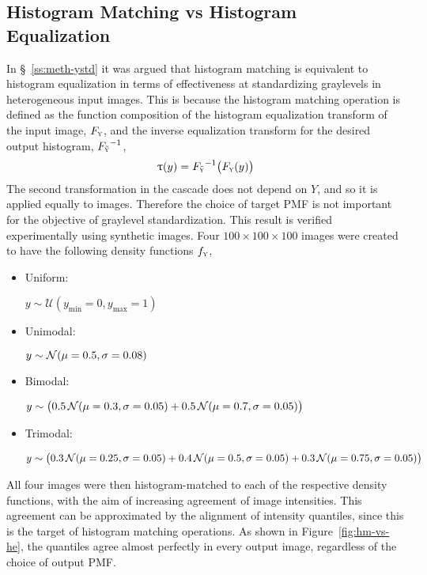 \subsection{Histogram Matching vs Histogram Equalization}\label{ss:hm-vs-he}
In \S~\ref{ss:meth-ystd} it was argued that
histogram matching is equivalent to histogram equalization
in terms of effectiveness at standardizing graylevels in heterogeneous input images.
This is because the histogram matching operation is defined as
the function composition of the histogram equalization transform of the input image, $F_{\textsc{y}}$,
and the inverse equalization transform for the desired output histogram, ${F_{\tilde{\textsc{y}}}}^{-1}$,
\begin{equation}
  \uptau(y) = {F_{\tilde{\textsc{y}}}}^{-1}\big(F_{\textsc{y}}(y)\big)
\end{equation}
The second transformation in the cascade does not depend on $Y$,
and so it is applied equally to images.
Therefore the choice of target PMF is not important for the objective of graylevel standardization.
This result is verified experimentally using synthetic images.
Four $100\times100\times100$ images were created to have the following density functions $f_{\textsc{y}}$,
\begin{itemize}[itemsep=0pt,topsep=0pt]
  \item \parbox{2cm}{Uniform:}
  $y\sim\mathcal{U}(y_{\min}=0,y_{\max}=1)$
  \item \parbox{2cm}{Unimodal:}
  $y\sim\mathcal{N}(\mu=0.5,\sigma=0.08)$
  \item \parbox{2cm}{Bimodal:}
  $y\sim\big(0.5\thinspace\mathcal{N}(\mu=0.3,\sigma=0.05)
            +0.5\thinspace\mathcal{N}(\mu=0.7,\sigma=0.05)\big)$
  \item \parbox{2cm}{Trimodal:}
  $y\sim\big(0.3\thinspace\mathcal{N}(\mu=0.25,\sigma=0.05)
            +0.4\thinspace\mathcal{N}(\mu=0.5,\sigma=0.05)
            +0.3\thinspace\mathcal{N}(\mu=0.75,\sigma=0.05)\big)$
\end{itemize}
All four images were then histogram-matched to each of the respective density functions,
with the aim of increasing agreement of image intensities.
This agreement can be approximated by the alignment of intensity quantiles,
since this is the target of histogram matching operations.
As shown in Figure~\ref{fig:hm-vs-he}, the quantiles agree almost perfectly in every output image,
regardless of the choice of output PMF\@.
